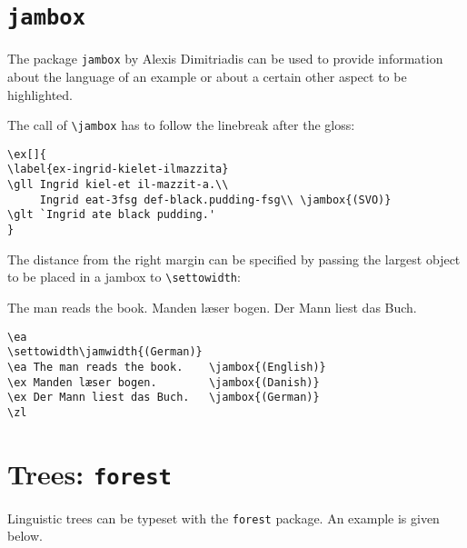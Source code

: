 \def\exfont{\normalsize\upshape}

\section{\texttt{jambox}}
\label{sec-jambox}


The package \texttt{jambox} by Alexis Dimitriadis can be used to provide information about the language of an example or
about a certain other aspect to be highlighted.
\settowidth{}
\eal
{}
\zl

The call of \verb+\jambox+ has to follow the linebreak after the gloss:
\begin{verbatim}
\ex[]{
\label{ex-ingrid-kielet-ilmazzita}
\gll Ingrid kiel-et il-mazzit-a.\\
     Ingrid eat-3fsg def-black.pudding-fsg\\ \jambox{(SVO)}
\glt `Ingrid ate black pudding.'
}
\end{verbatim}
The distance from the right margin can be specified by passing the largest object to be placed in a
jambox to \verb+\settowidth+:

\ea 
\settowidth{}
  \ea The man reads the book.    
  \ex Manden læser bogen.        
  \ex Der Mann liest das Buch.   
  \z 
\z

\begin{verbatim}
\ea 
\settowidth\jamwidth{(German)}
\ea The man reads the book.    \jambox{(English)}
\ex Manden læser bogen.        \jambox{(Danish)}
\ex Der Mann liest das Buch.   \jambox{(German)}
\zl
\end{verbatim}



\section{Trees: \texttt{forest}}
Linguistic trees can be typeset with the \verb+forest+ package. An example is given below.

